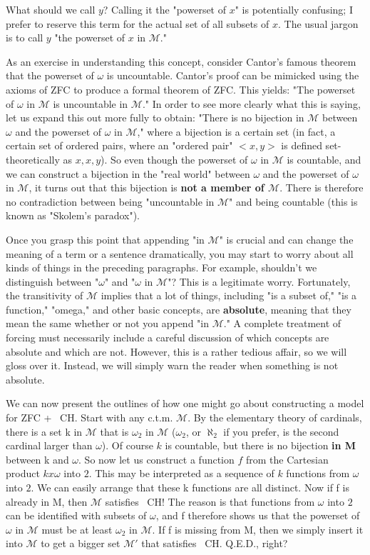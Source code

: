 \documentclass[10pt]{article}
\theoremstyle{definition}
\begin{document}
What should we call $y$?  Calling it the "powerset of $x$" is potentially
confusing; I prefer to reserve this term for the actual set of all subsets
of $x$.  The usual jargon is to call $y$ "the powerset of $x$ in $\mathcal M$."

As an exercise in understanding this concept, consider Cantor's famous
theorem that the powerset of $\omega$ is uncountable.  Cantor's proof can be
mimicked using the axioms of ZFC to produce a formal theorem of ZFC.  This
yields: "The powerset of $\omega$ in $\mathcal{M}$ is uncountable in $\mathcal M$."  In order to see
more clearly what this is saying, let us expand this out more fully to
obtain: "There is no bijection in $\mathcal{M}$ between $\omega$ and the powerset of $\omega$
in $\mathcal M$," where a bijection is a certain set (in fact, a certain set of ordered
pairs, where an "ordered pair" $<x,y>$ is defined set-theoretically as ${{x},
{x,y}}$).  So even though the powerset of $\omega$ in $\mathcal{M}$ is countable, and we can
construct a bijection in the "real world" between $\omega$ and the powerset of
$\omega$ in $\mathcal M$, it turns out that this bijection is \textbf{not a member of $\mathcal M$}.  There
is therefore no contradiction between being "uncountable in $\mathcal M$" and being
countable (this is known as "Skolem's paradox").

Once you grasp this point that appending "in $\mathcal M$" is crucial and can change
the meaning of a term or a sentence dramatically, you may start to worry
about all kinds of things in the preceding paragraphs.  For example,
shouldn't we distinguish between "$\omega$" and "$\omega$ in $\mathcal M$"?  This is a
legitimate worry.  Fortunately, the transitivity of $\mathcal{M}$ implies that a lot of
things, including "is a subset of," "is a function," "omega," and other
basic concepts, are \textbf{absolute}, meaning that they mean the same whether or
not you append "in $\mathcal M$."  A complete treatment of forcing must necessarily
include a careful discussion of which concepts are absolute and which are
not.  However, this is a rather tedious affair, so we will gloss over it.
Instead, we will simply warn the reader when something is not absolute.

We can now present the outlines of how one might go about constructing a
model for ZFC + ~CH.  Start with any c.t.m. $\mathcal M$.  By the elementary theory of
cardinals, there is a set k in $\mathcal{M}$ that is $\omega_2$ in $\mathcal{M}$ ($\omega_2$, or $\aleph_2$
if you prefer, is the second cardinal larger than $\omega$).  Of course $k$ is
countable, but there is no bijection \textbf{in M} between k and $\omega$.  So now let
us construct a function $f$ from the Cartesian product $k x \omega$ into $2$.  This
may be interpreted as a sequence of $k$ functions from $\omega$ into $2$.  We can
easily arrange that these k functions are all distinct.  Now if f is already
in M, then $\mathcal{M}$ satisfies ~CH!  The reason is that functions from $\omega$ into $2$
can be identified with subsets of $\omega$, and f therefore shows us that the
powerset of $\omega$ in $\mathcal{M}$ must be at least $\omega_2$ in $\mathcal M$.  If f is missing from
M, then we simply insert it into $\mathcal{M}$ to get a bigger set $\mathcal{M'}$ that satisfies
~CH.  Q.E.D., right?
\end{document}
